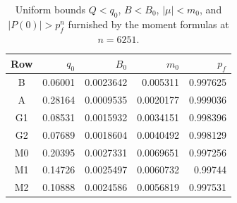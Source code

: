 \documentclass[11pt,reqno]{amsart}
\numberwithin{equation}{section}
\theoremstyle{definition}
\theoremstyle{remark}
\begin{document}
\begin{table}[ht]
\centering\small
\caption{Uniform bounds $Q<q_0$, $B<B_0$, $|\mu|<m_0$, and
$|P(0)|>p_f^n$ furnished by the moment formulas at $n=6251$.}
\label{bc:refined-table}
\begin{tabular}{@{}crrrr@{}}\toprule
Row&$q_0$&$B_0$&$m_0$&$p_f$\\\midrule
B & 0.06001 & 0.0023642 & 0.005311 & 0.997625\\
A & 0.28164 & 0.0009535 & 0.0020177 & 0.999036\\
G1 & 0.08531 & 0.0015932 & 0.0034151 & 0.998396\\
G2 & 0.07689 & 0.0018604 & 0.0040492 & 0.998129\\
M0 & 0.20395 & 0.0027331 & 0.0069651 & 0.997256\\
M1 & 0.14726 & 0.0025497 & 0.0060732 & 0.99744\\
M2 & 0.10888 & 0.0024586 & 0.0056819 & 0.997531\\
\bottomrule\end{tabular}
\end{table}
\end{document}
